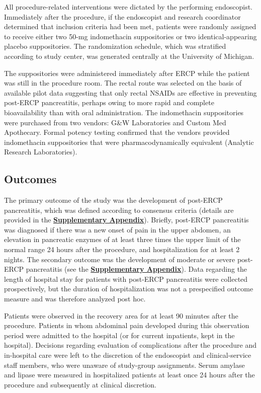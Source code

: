 \documentclass[
  10pt,
  letterpaper,
]{article}
\begin{document}
All procedure-related interventions were dictated by the performing
endoscopist. Immediately after the procedure, if the endoscopist and
research coordinator determined that inclusion criteria had been met,
patients were randomly assigned to receive either two 50-mg indomethacin
suppositories or two identical-appearing placebo suppositories. The
randomization schedule, which was stratified according to study center,
was generated centrally at the University of Michigan.

The suppositories were administered immediately after ERCP while the
patient was still in the procedure room. The rectal route was selected
on the basis of available pilot data suggesting that only rectal NSAIDs
are effective in preventing post-ERCP pancreatitis, perhaps owing to
more rapid and complete bioavailability than with oral
administration.\citep{elmunzer2008, vandermarel2004} The indomethacin
suppositories were purchased from two vendors: G\&W Laboratories and
Custom Med Apothecary. Formal potency testing confirmed that the vendors
provided indomethacin suppositories that were pharmacodynamically
equivalent (Analytic Research Laboratories).

\subsection{Outcomes}\label{outcomes}

The primary outcome of the study was the development of post-ERCP
pancreatitis, which was defined according to consensus
criteria\citep{cotton1991} (details are provided in the
\href{https://www.nejm.org/doi/suppl/10.1056/NEJMoa1111103/suppl_file/nejmoa1111103_appendix.pdf}{\textbf{Supplementary
Appendix}}). Briefly, post-ERCP pancreatitis was diagnosed if there was
a new onset of pain in the upper abdomen, an elevation in pancreatic
enzymes of at least three times the upper limit of the normal range 24
hours after the procedure, and hospitalization for at least 2 nights.
The secondary outcome was the development of moderate or severe
post-ERCP pancreatitis (see the
\href{https://www.nejm.org/doi/suppl/10.1056/NEJMoa1111103/suppl_file/nejmoa1111103_appendix.pdf}{\textbf{Supplementary
Appendix}}). Data regarding the length of hospital stay for patients
with post-ERCP pancreatitis were collected prospectively, but the
duration of hospitalization was not a prespecified outcome measure and
was therefore analyzed post hoc.

Patients were observed in the recovery area for at least 90 minutes
after the procedure. Patients in whom abdominal pain developed during
this observation period were admitted to the hospital (or for current
inpatients, kept in the hospital). Decisions regarding evaluation of
complications after the procedure and in-hospital care were left to the
discretion of the endoscopist and clinical-service staff members, who
were unaware of study-group assignments. Serum amylase and lipase were
measured in hospitalized patients at least once 24 hours after the
procedure and subsequently at clinical discretion.
\end{document}
